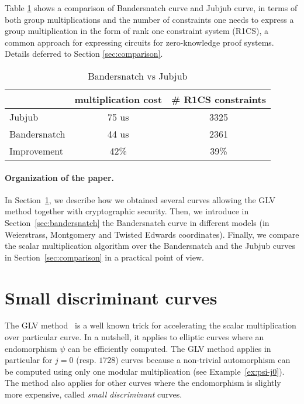 \documentclass{article}
\theoremstyle{definition}
\begin{document}
Table \ref{tab:comp} shows a comparison of Bandersnatch curve
and Jubjub curve, in terms of both group multiplications and 
the number of constraints one needs to express a group multiplication
in the form of rank one constraint system (R1CS), 
a common approach for expressing circuits for zero-knowledge 
proof systems. Details deferred to Section \ref{sec:comparison}.

\begin{table}[h] %
  \centering
  
  \begin{tabular}{|l|c|c|}\hline
      & multiplication cost & \# R1CS constraints \\\hline\hline
    Jubjub & 75 us & 3325 \\\hline
    Bandersnatch & 44 us & 2361 \\\hline\hline   
    Improvement & 42\% & 39\%\\\hline
  \end{tabular}
  \caption{Bandersnatch vs Jubjub}
  \label{tab:comp}
\end{table}



\paragraph{Organization of the paper.}
In Section~\ref{sec:small-disc-curves}, we describe how we obtained
several curves allowing the GLV method together with cryptographic
security.
Then, we introduce in Section~\ref{sec:bandersnatch} the Bandersnatch
curve in different models (in Weierstrass, Montgomery and Twisted Edwards
coordinates).
Finally, we compare the scalar multiplication algorithm over
the Bandersnatch and the Jubjub curves in
Section~\ref{sec:comparison} in a practical point of view.


\section{Small discriminant curves}\label{sec:small-disc-curves}

The GLV method~\cite{C:GalLamVan01} is a well known trick for accelerating the
scalar multiplication over particular curve. In a nutshell, it applies
to elliptic curves where an endomorphism $\psi$ can be efficiently computed.
The GLV method applies in particular for $j=0$ (resp. $1728$) curves
because a non-trivial automorphism can be computed using only one
modular multiplication (see Example~\ref{ex:psi-j0}).
The method also applies for other curves where the endomorphism is
slightly more expensive, called \emph{small discriminant} curves.
\end{document}
